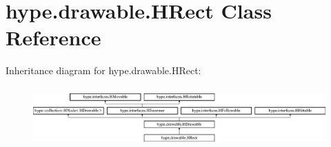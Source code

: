\hypertarget{classhype_1_1drawable_1_1_h_rect}{\section{hype.\-drawable.\-H\-Rect Class Reference}
\label{classhype_1_1drawable_1_1_h_rect}
}
Inheritance diagram for hype.\-drawable.\-H\-Rect\-:\begin{figure}[H]
\begin{center}
\leavevmode
\includegraphics[height=2.333333cm]{classhype_1_1drawable_1_1_h_rect}
\end{center}
\end{figure}
